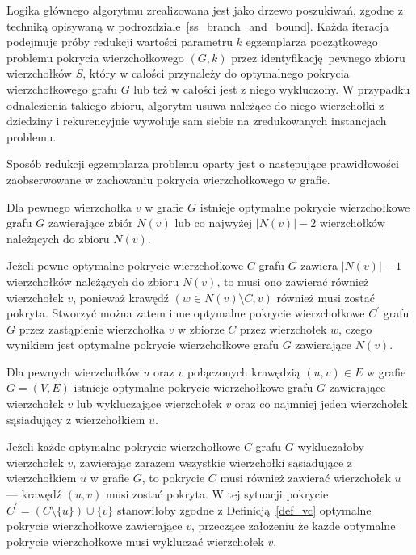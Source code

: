 \par{
  Logika głównego algorytmu zrealizowana jest jako drzewo poszukiwań, zgodne z techniką opisywaną w podrozdziale~\ref{ss_branch_and_bound}.
  Każda iteracja podejmuje próby redukcji wartości parametru $k$ egzemplarza początkowego problemu pokrycia wierzchołkowego $(G, k)$ przez identyfikację pewnego zbioru wierzchołków $S$, który w całości przynależy do optymalnego pokrycia wierzchołkowego grafu $G$ lub też w całości jest z niego wykluczony.
  W przypadku odnalezienia takiego zbioru, algorytm usuwa należące do niego wierzchołki z dziedziny i rekurencyjnie wywołuje sam siebie na zredukowanych instancjach problemu.

  Sposób redukcji egzemplarza problemu oparty jest o następujące prawidłowości zaobserwowane w zachowaniu pokrycia wierzchołkowego w grafie.
  \begin{theorem}
    Dla pewnego wierzchołka $v$ w grafie $G$ istnieje optymalne pokrycie wierzchołkowe grafu $G$ zawierające zbiór $N(v)$ lub co najwyżej $|N(v)| - 2$ wierzchołków należących do zbioru $N(v)$.
  \end{theorem}
  \begin{bproof}
    Jeżeli pewne optymalne pokrycie wierzchołkowe $C$ grafu $G$ zawiera $|N(v)|-1$ wierzchołków należących do zbioru $N(v)$, to musi ono zawierać również wierzchołek $v$, ponieważ krawędź $(w \in N(v) \setminus C, v)$ również musi zostać pokryta.
    Stworzyć można zatem inne optymalne pokrycie wierzchołkowe $C^\prime$ grafu $G$ przez zastąpienie wierzchołka $v$ w zbiorze $C$ przez wierzchołek $w$, czego wynikiem jest optymalne pokrycie wierzchołkowe grafu $G$ zawierające $N(v)$.
  \end{bproof}
  \begin{theorem}
    Dla pewnych wierzchołków $u$ oraz $v$ połączonych krawędzią $(u, v) \in E$ w grafie $G=(V, E)$ istnieje optymalne pokrycie wierzchołkowe grafu $G$ zawierające wierzchołek $v$ lub wykluczające wierzchołek $v$ oraz co najmniej jeden wierzchołek sąsiadujący z wierzchołkiem $u$.
  \end{theorem}
  \begin{bproof}
    Jeżeli każde optymalne pokrycie wierzchołkowe $C$ grafu $G$ wykluczałoby wierzchołek $v$, zawierając zarazem wszystkie wierzchołki sąsiadujące z wierzchołkiem $u$ w grafie $G$, to pokrycie $C$ musi również zawierać wierzchołek $u$ --- krawędź $(u, v)$ musi zostać pokryta.
    W tej sytuacji pokrycie $C^\prime=(C \setminus \{u\}) \cup \{v\}$ stanowiłoby zgodne z Definicją~\ref{def_vc} optymalne pokrycie wierzchołkowe zawierające $v$, przeczące założeniu że każde optymalne pokrycie wierzchołkowe musi wykluczać wierzchołek $v$.

\end{bproof}}
